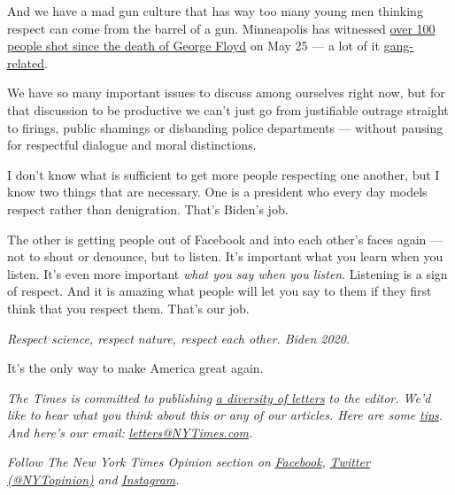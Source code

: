 And we have a mad gun culture that has way too many young men thinking
respect can come from the barrel of a gun. Minneapolis has witnessed
\href{https://www.startribune.com/a-month-after-floyd-s-death-city-struggles-with-twin-crises/571496482/?refresh=true}{over
100 people shot since the death of George Floyd} on May 25 --- a lot of
it
\href{https://www.kare11.com/article/news/health/coronavirus/minneapolis-dealing-with-multiple-crises/89-125767bb-f565-481a-9d50-a2636ddf309b}{gang-related}.

We have so many important issues to discuss among ourselves right now,
but for that discussion to be productive we can't just go from
justifiable outrage straight to firings, public shamings or disbanding
police departments --- without pausing for respectful dialogue and moral
distinctions.

I don't know what is sufficient to get more people respecting one
another, but I know two things that are necessary. One is a president
who every day models respect rather than denigration. That's Biden's
job.

The other is getting people out of Facebook and into each other's faces
again --- not to shout or denounce, but to listen. It's important what
you learn when you listen. It's even more important \emph{what you say
when you listen}. Listening is a sign of respect. And it is amazing what
people will let you say to them if they first think that you respect
them. That's our job.

\emph{Respect science, respect nature, respect each other. Biden 2020.}

It's the only way to make America great again.

\emph{The Times is committed to publishing}
\href{https://www.nytimes3xbfgragh.onion/2019/01/31/opinion/letters/letters-to-editor-new-york-times-women.html}{\emph{a
diversity of letters}} \emph{to the editor. We'd like to hear what you
think about this or any of our articles. Here are some}
\href{https://help.nytimes3xbfgragh.onion/hc/en-us/articles/115014925288-How-to-submit-a-letter-to-the-editor}{\emph{tips}}\emph{.
And here's our email:}
\href{mailto:letters@NYTimes.com}{\emph{letters@NYTimes.com}}\emph{.}

\emph{Follow The New York Times Opinion section on}
\href{https://www.facebookcorewwwi.onion/nytopinion}{\emph{Facebook}}\emph{,}
\href{http://twitter.com/NYTOpinion}{\emph{Twitter (@NYTopinion)}}
\emph{and}
\href{https://www.instagram.com/nytopinion/}{\emph{Instagram}}\emph{.}

